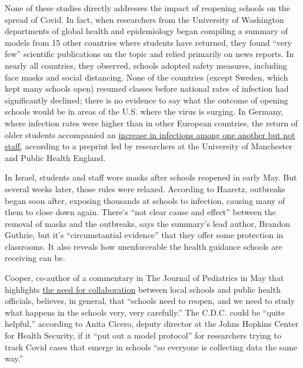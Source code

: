 None of these studies directly addresses the impact of reopening schools
on the spread of Covid. In fact, when researchers from the University of
Washington departments of global health and epidemiology began compiling
a summary of models from 15 other countries where students have
returned, they found ``very few'' scientific publications on the topic
and relied primarily on news reports. In nearly all countries, they
observed, schools adopted safety measures, including face masks and
social distancing. None of the countries (except Sweden, which kept many
schools open) resumed classes before national rates of infection had
significantly declined; there is no evidence to say what the outcome of
opening schools would be in areas of the U.S. where the virus is
surging. In Germany, where infection rates were higher than in other
European countries, the return of older students accompanied an
\href{https://www.medrxiv.org/content/10.1101/2020.06.24.20139634v1.full.pdf}{increase
in infections among one another but not staff,} according to a preprint
led by researchers at the University of Manchester and Public Health
England.

In Israel, students and staff wore masks after schools reopened in early
May. But several weeks later, those rules were relaxed. According to
Haaretz, outbreaks began soon after, exposing thousands at schools to
infection, causing many of them to close down again. There's ``not clear
cause and effect'' between the removal of masks and the outbreaks, says
the summary's lead author, Brandon Guthrie, but it's ``circumstantial
evidence'' that they offer some protection in classrooms. It also
reveals how unenforceable the health guidance schools are receiving can
be.

Cooper, co-author of a commentary in The Journal of Pediatrics in May
that highlights
\href{https://www.jpeds.com/article/S0022-3476(20)30608-9/fulltext\#\%20}{the
need for collaboration} between local schools and public health
officials, believes, in general, that ``schools need to reopen, and we
need to study what happens in the schools very, very carefully.'' The
C.D.C. could be ``quite helpful,'' according to Anita Cicero, deputy
director at the Johns Hopkins Center for Health Security, if it ``put
out a model protocol'' for researchers trying to track Covid cases that
emerge in schools ``so everyone is collecting data the same way.''

